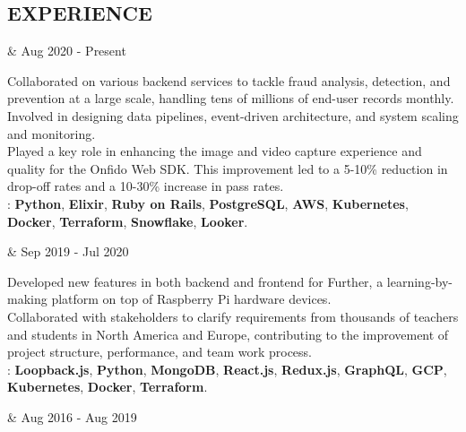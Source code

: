 \subsection*{EXPERIENCE}

\begin{workexp}
   \at \href{https://onfido.com/}{}  &
  Aug 2020 - Present
\end{workexp}

\tbullet Collaborated on various backend services to tackle fraud analysis, detection, and prevention at a large scale, handling tens of millions of end-user records monthly. Involved in designing data pipelines, event-driven architecture, and system scaling and monitoring. \\[1mm]
\tbullet Played a key role in enhancing the image and video capture experience and quality for the Onfido Web SDK. This improvement led to a 5-10\% reduction in drop-off rates and a 10-30\% increase in pass rates. \\[3mm]
: \textbf{Python}, \textbf{Elixir}, \textbf{Ruby on Rails}, \textbf{PostgreSQL}, \textbf{AWS}, \textbf{Kubernetes}, \textbf{Docker}, \textbf{Terraform}, \textbf{Snowflake}, \textbf{Looker}.

\vspace{7.5mm} 

\begin{workexp}
   \at \href{https://www.pi-top.com/}{}  &
  Sep 2019 - Jul 2020 
\end{workexp}

\tbullet Developed new features in both backend and frontend for Further, a learning-by-making platform on top of Raspberry Pi hardware devices. \\[1mm]
\tbullet Collaborated with stakeholders to clarify requirements from thousands of teachers and students in North America and Europe, contributing to the improvement of project structure, performance, and team work process. \\[3mm]
: \textbf{Loopback.js}, \textbf{Python}, \textbf{MongoDB}, \textbf{React.js}, \textbf{Redux.js}, \textbf{GraphQL}, \textbf{GCP}, \textbf{Kubernetes}, \textbf{Docker}, \textbf{Terraform}.

\vspace{7.5mm} 

\begin{workexp}
   \at \href{https://youtu.be/_FhxbwNqGS8}{}  &
  Aug 2016 - Aug 2019 
\end{workexp}


